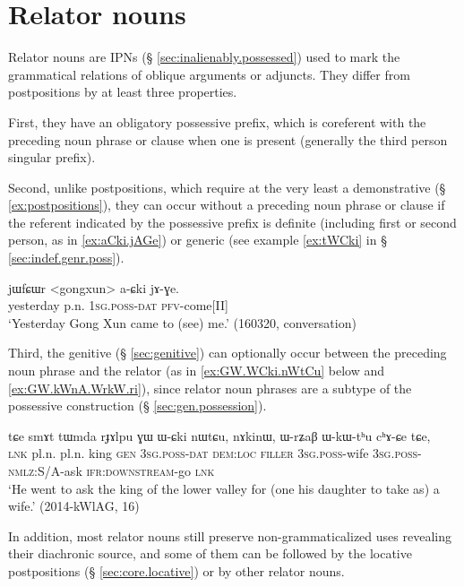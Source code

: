  
\section{Relator nouns}  \label{sec:relator.nouns}  
Relator nouns are IPNs (§ \ref{sec:inalienably.possessed}) used to mark the grammatical relations of oblique arguments or adjuncts. They differ from postpositions by at least three properties. 

First, they have an obligatory possessive prefix, which is coreferent with the preceding noun phrase or clause when one is present (generally the third person singular  prefix). 

Second, unlike postpositions, which require at the very least a demonstrative (§ \ref{ex:postpositions}), they can occur without a preceding noun phrase or clause if the referent indicated by the possessive prefix is definite (including first or second person, as in \ref{ex:aCki.jAGe}) or generic (see example \ref{ex:tWCki} in § \ref{sec:indef.genr.poss}). 

\begin{exe}
\ex \label{ex:aCki.jAGe}
\gll jɯfɕɯr <gongxun> a-ɕki jɤ-ɣe. \\
yesterday p.n. \textsc{1sg}.\textsc{poss}-\textsc{dat} \textsc{pfv}-come[II] \\
\glt `Yesterday Gong Xun came to (see) me.' (160320, conversation)
\end{exe}

Third, the genitive  (§ \ref{sec:genitive}) can optionally occur between the preceding noun phrase and the relator (as in \ref{ex:GW.WCki.nWtCu} below and \ref{ex:GW.kWnA.WrkW.ri}), since relator noun phrases are a subtype of the possessive construction (§ \ref{sec:gen.possession}).

\begin{exe}
\ex \label{ex:GW.WCki.nWtCu}
\gll tɕe smɤt tɯmda rɟɤlpu ɣɯ ɯ-ɕki nɯtɕu, nɤkinɯ, ɯ-rʑaβ ɯ-kɯ-tʰu cʰɤ-ɕe tɕe, \\
\textsc{lnk} pl.n. pl.n. king \textsc{gen} \textsc{3sg}.\textsc{poss}-\textsc{dat} \textsc{dem}:\textsc{loc} \textsc{filler} \textsc{3sg}.\textsc{poss}-wife \textsc{3sg}.\textsc{poss}-\textsc{nmlz}:S/A-ask \textsc{ifr}:\textsc{downstream}-go \textsc{lnk} \\
\glt `He went to ask the king of the lower valley for (one his daughter to take as) a wife.' (2014-kWlAG, 16)
\end{exe}

In addition, most relator nouns still preserve non-grammaticalized uses revealing their diachronic source, and some of them can be followed by the locative postpositions (§ \ref{sec:core.locative}) or by other relator nouns.

